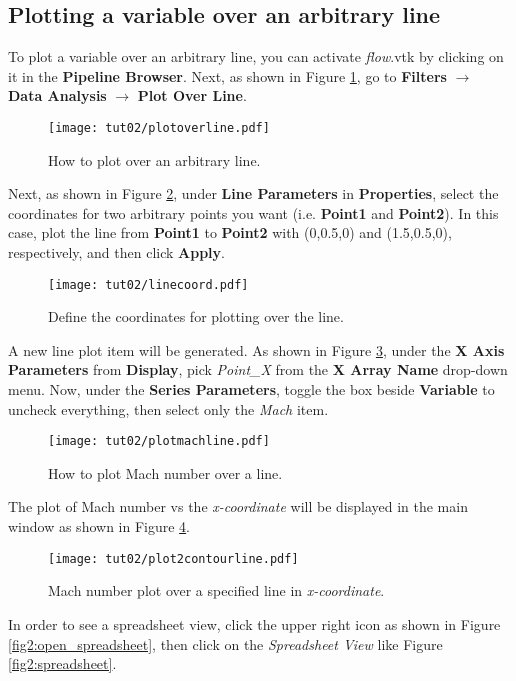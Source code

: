 \subsection{Plotting a variable over an arbitrary line}
To plot a variable over an arbitrary line, you can activate \textit{flow}.vtk by clicking on it in the \textbf{Pipeline Browser}. Next, as shown in Figure \ref{fig2:plot_over_line}, go to \textbf{Filters} $\rightarrow$  \textbf{Data Analysis} $\rightarrow$  \textbf{Plot Over Line}.
\begin{figure}[htbp]
    \centering
    \texttt{[image: tut02/plotoverline.pdf]}
    \caption{How to plot over an arbitrary line.}
    \label{fig2:plot_over_line}
\end{figure}
Next, as shown in Figure \ref{fig2:line_coordinate}, under \textbf{Line Parameters} in \textbf{Properties}, select the coordinates for two arbitrary points you want (i.e. \textbf{Point1} and \textbf{Point2}). In this case, plot the line from \textbf{Point1} to \textbf{Point2} with (0,0.5,0) and (1.5,0.5,0), respectively, and then click \textbf{Apply}.
\begin{figure}[htbp]
    \centering
    \texttt{[image: tut02/linecoord.pdf]}
    \caption{Define the coordinates for plotting over the line.}
    \label{fig2:line_coordinate}
\end{figure}
A new line plot item will be generated. As shown in Figure \ref{fig2:plot_line_setting}, under the \textbf{X Axis Parameters} from \textbf{Display}, pick \textit{Point\_X} from the \textbf{X Array Name} drop-down menu. Now, under the \textbf{Series Parameters}, toggle the box beside \textbf{Variable} to uncheck everything, then select only the \textit{Mach} item.
\begin{figure}[htbp]
    \centering
    \texttt{[image: tut02/plotmachline.pdf]}
    \caption{How to plot Mach number over a line.}
    \label{fig2:plot_line_setting}
\end{figure}
The plot of Mach number vs the \textit{x-coordinate} will be displayed in the main window as shown in Figure \ref{fig2:plot_line}.
\begin{figure}[htbp]
    \centering
    \texttt{[image: tut02/plot2contourline.pdf]}
    \caption{Mach number plot over a specified line in \textit{x-coordinate}.}
    \label{fig2:plot_line}
\end{figure}
In order to see a spreadsheet view, click the upper right icon as shown in Figure \ref{fig2:open_spreadsheet}, then click on the \textit{Spreadsheet View} like Figure \ref{fig2:spreadsheet}.
